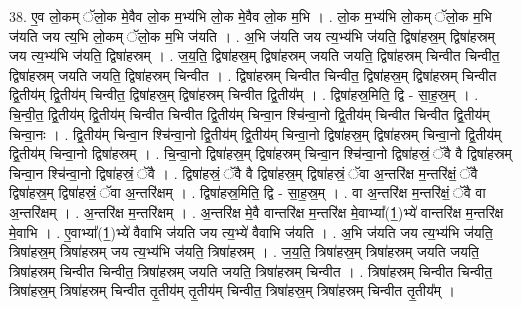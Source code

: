\documentclass[17pt]{extarticle}
\begin{document}
38. ए॒व लो॒कम् ॅलो॒क मे॒वैव लो॒क म॒भ्य॑भि लो॒क मे॒वैव लो॒क म॒भि । . लो॒क म॒भ्य॑भि लो॒कम् ॅलो॒क म॒भि ज॑यति जय त्य॒भि लो॒कम् ॅलो॒क म॒भि ज॑यति । . अ॒भि ज॑यति जय त्य॒भ्य॑भि ज॑यति॒ द्विषा॑हस्र॒म् द्विषा॑हस्रम् जय त्य॒भ्य॑भि ज॑यति॒ द्विषा॑हस्रम् । . ज॒य॒ति॒ द्विषा॑हस्र॒म् द्विषा॑हस्रम् जयति जयति॒ द्विषा॑हस्रम् चिन्वीत चिन्वीत॒ द्विषा॑हस्रम् जयति जयति॒ द्विषा॑हस्रम् चिन्वीत । . द्विषा॑हस्रम् चिन्वीत चिन्वीत॒ द्विषा॑हस्र॒म् द्विषा॑हस्रम् चिन्वीत द्वि॒तीय॑म् द्वि॒तीय॑म् चिन्वीत॒ द्विषा॑हस्र॒म् द्विषा॑हस्रम् चिन्वीत द्वि॒तीय᳚म् । . द्विषा॑हस्र॒मिति॒ द्वि - सा॒ह॒स्र॒म् । . चि॒न्वी॒त॒ द्वि॒तीय॑म् द्वि॒तीय॑म् चिन्वीत चिन्वीत द्वि॒तीय॑म् चिन्वा॒न श्चि॑न्वा॒नो द्वि॒तीय॑म् चिन्वीत चिन्वीत द्वि॒तीय॑म् चिन्वा॒नः । . द्वि॒तीय॑म् चिन्वा॒न श्चि॑न्वा॒नो द्वि॒तीय॑म् द्वि॒तीय॑म् चिन्वा॒नो द्विषा॑हस्र॒म् द्विषा॑हस्रम् चिन्वा॒नो द्वि॒तीय॑म् द्वि॒तीय॑म् चिन्वा॒नो द्विषा॑हस्रम् । . चि॒न्वा॒नो द्विषा॑हस्र॒म् द्विषा॑हस्रम् चिन्वा॒न श्चि॑न्वा॒नो द्विषा॑हस्रं॒ ॅवै वै द्विषा॑हस्रम् चिन्वा॒न श्चि॑न्वा॒नो द्विषा॑हस्रं॒ ॅवै । . द्विषा॑हस्रं॒ ॅवै वै द्विषा॑हस्र॒म् द्विषा॑हस्रं॒ ॅवा अ॒न्तरि॑क्ष म॒न्तरि॑क्षं॒ ॅवै द्विषा॑हस्र॒म् द्विषा॑हस्रं॒ ॅवा अ॒न्तरि॑क्षम् । . द्विषा॑हस्र॒मिति॒ द्वि - सा॒ह॒स्र॒म् । . वा अ॒न्तरि॑क्ष म॒न्तरि॑क्षं॒ ॅवै वा अ॒न्तरि॑क्षम् । . अ॒न्तरि॑क्ष म॒न्तरि॑क्षम् । . अ॒न्तरि॑क्ष मे॒वै वान्तरि॑क्ष म॒न्तरि॑क्ष मे॒वाभ्या᳚(1॒)भ्ये॑ वान्तरि॑क्ष म॒न्तरि॑क्ष मे॒वाभि । . ए॒वाभ्या᳚(1॒)भ्ये॑ वैवाभि ज॑यति जय त्य॒भ्ये॑ वैवाभि ज॑यति । . अ॒भि ज॑यति जय त्य॒भ्य॑भि ज॑यति॒ त्रिषा॑हस्र॒म् त्रिषा॑हस्रम् जय त्य॒भ्य॑भि ज॑यति॒ त्रिषा॑हस्रम् । . ज॒य॒ति॒ त्रिषा॑हस्र॒म् त्रिषा॑हस्रम् जयति जयति॒ त्रिषा॑हस्रम् चिन्वीत चिन्वीत॒ त्रिषा॑हस्रम् जयति जयति॒ त्रिषा॑हस्रम् चिन्वीत । . त्रिषा॑हस्रम् चिन्वीत चिन्वीत॒ त्रिषा॑हस्र॒म् त्रिषा॑हस्रम् चिन्वीत तृ॒तीय॑म् तृ॒तीय॑म् चिन्वीत॒ त्रिषा॑हस्र॒म् त्रिषा॑हस्रम् चिन्वीत तृ॒तीय᳚म् । \newline
\end{document}
